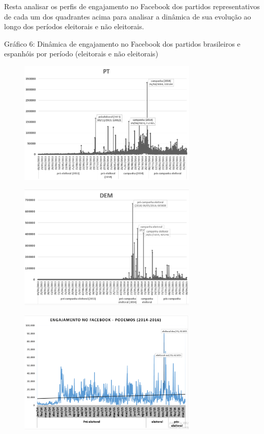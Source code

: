 Resta analisar os perfis de engajamento no Facebook dos partidos
representativos de cada um dos quadrantes acima para analisar a dinâmica
de sua evolução ao longo dos períodos eleitorais e não eleitorais.

\pagebreak
\begin{center}
Gráfico 6: Dinâmica de engajamento no Facebook dos partidos brasileiros
e espanhóis por período (eleitorais e não eleitorais)


\begin{figure}[!ht]
\centering
 \includegraphics[width=85mm]{./imgs/graf6_1.png}
\end{figure}

\begin{figure}[!htpb]
\centering
 \includegraphics[width=85mm]{./imgs/graf6_2.png}
\end{figure}

\begin{figure}[!htpb]
\centering
 \includegraphics[width=85mm]{./imgs/graf6_3.png}
\end{figure}


\end{center}
